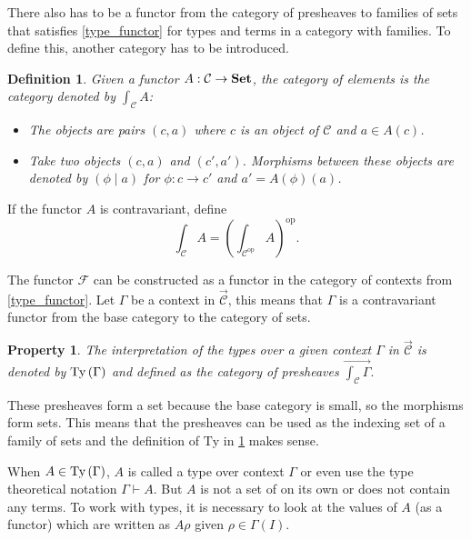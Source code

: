 \documentclass[12pt,a4paper,twoside,xetex]{book} %
\newcommand{\keyword}[1]{\emph{#1}\index{#1}}
\newtheorem{definition}[theorem]{Definition}
\newtheorem{property}[theorem]{Property}
\newcommand{\psh}[1]{\overrightarrow{#1}}
\newcommand{\coe}[2]{\int_{#1}{#2}}
\begin{document}
There also has to be a functor from the category of presheaves to families of 
sets that satisfies \cref{type_functor} for types and terms in a category with 
families. To define this, another category has to be introduced.

\begin{definition}\label{catel}
Given a functor $A:\mathcal{C} \rightarrow \text{\textbf{Set}}$, the \keyword{category of 
elements} is the category denoted by $\int_{\mathcal{C}} A$:

\begin{itemize}
\item The objects are pairs $(c,a)$ where $c$ is an object of $\mathcal{C}$ and 
$a\in A(c)$.
\item Take two objects $(c,a)$ and $(c',a')$. Morphisms between these objects 
are denoted by $(\phi \mid a)$ for $\phi : c \rightarrow c'$ and $a' = 
A(\phi)(a)$.
\end{itemize}
\end{definition}

If the functor $A$ is contravariant, define $$\coe{\mathcal{C}}{A} = 
\left(\coe{\mathcal{C}^{\text{op}}}{A} \right)^{\text{op}}.$$

The functor $\mathcal{F}$ can be constructed as a functor in the category of 
contexts from \cref{type_functor}. Let $\Gamma$ be a context in $\psh{\mathcal{C}}$, this means that $\Gamma$ is a contravariant functor from the base 
category to the category of sets. 

\begin{property}\label{prety}
The interpretation of the types over a given context $\Gamma$ in $\psh{\mathcal{C}}$ is denoted by $\text{Ty}\left(\Gamma\right)$ and defined as the category of presheaves $\psh{\coe{\mathcal{C}}{\Gamma}}.$
\end{property}

These presheaves form a set because the base category is small, so the 
morphisms form sets. This means that the presheaves can be used as the indexing 
set of a family of sets and the definition of $\text{Ty}$ in \cref{prety} makes 
sense. 

When $A \in \text{Ty}\left(\Gamma\right)$,  $A$ is called a type over context $\Gamma$ 
or even use the type theoretical notation $\Gamma \vdash A$. But $A$ is not a 
set of on its own or does not contain any terms. To work with types, it is 
necessary to look at the values of $A$ (as a functor) which are written as 
$A\rho$ given $\rho \in \Gamma (I)$.
\end{document}
